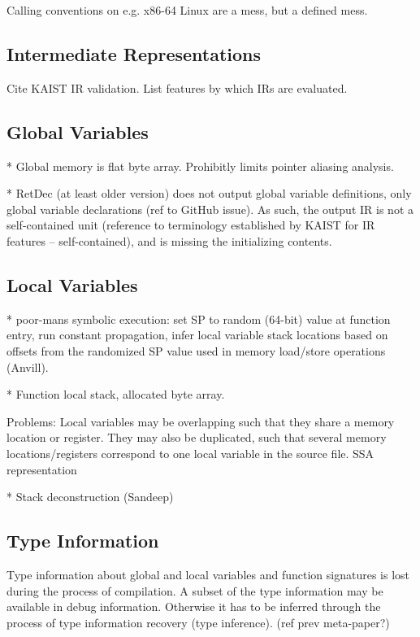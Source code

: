 Calling conventions on e.g. x86-64 Linux are a mess, but a defined mess.


\subsection{Intermediate Representations}

Cite KAIST IR validation. List features by which IRs are evaluated.


\subsection{Global Variables}

* Global memory is flat byte array. Prohibitly limits pointer aliasing analysis.

* RetDec (at least older version) does not output global variable definitions, only global variable declarations (ref to GitHub issue). As such, the output IR is not a self-contained unit (reference to terminology established by KAIST for IR features -- self-contained), and is missing the initializing contents.


\subsection{Local Variables}

* poor-mans symbolic execution: set SP to random (64-bit) value at function entry, run constant propagation, infer local variable stack locations based on offsets from the randomized SP value used in memory load/store operations  (Anvill).

* Function local stack, allocated byte array.

Problems: Local variables may be overlapping such that they share a memory location or register. They may also be duplicated, such that several memory locations/registers correspond to one local variable in the source file. SSA representation

* Stack deconstruction (Sandeep)


\subsection{Type Information}

Type information about global and local variables and function signatures is lost during the process of compilation. A subset of the type information may be available in debug information. Otherwise it has to be inferred through the process of type information recovery (type inference). (ref prev meta-paper?)

